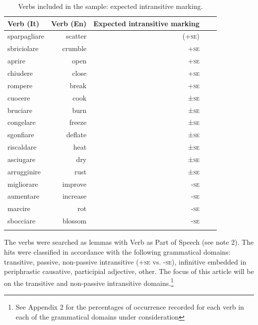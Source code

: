 \documentclass[output=paper,colorlinks,citecolor=brown
]{langscibook}
\begin{document}
\begin{table}[hbt!]
\caption{Verbs included in the sample: expected intransitive marking. }
\label{tab:bentley_table_1}
 \begin{tabularx}{.8\textwidth}{X rrrr}
  \lsptoprule
  Verb (It)  & Verb (En) & Expected intransitive marking \\
  \midrule
sparpagliare & 	scatter	& (+\textsc{se}) \\
sbriciolare &	crumble	& +\textsc{se} \\
aprire 	& open	& +\textsc{se} \\
chiudere &	close	& +\textsc{se} \\
rompere &	break	& +\textsc{se} \\
cuocere &	cook	& ±\textsc{se} \\
bruciare &	burn	& ±\textsc{se} \\
congelare &	freeze	& ±\textsc{se} \\
sgonfiare &	deflate	& ±\textsc{se} \\
riscaldare &	heat	& ±\textsc{se} \\
asciugare &	dry	& ±\textsc{se} \\
arrugginire &	rust	& ±\textsc{se} \\
migliorare &	improve	& -\textsc{se} \\
aumentare &	increase	& -\textsc{se} \\
marcire	& rot	& -\textsc{se} \\
sbocciare &	blossom	& -\textsc{se} \\
  \lspbottomrule
 \end{tabularx}
\end{table}

The verbs were searched as lemmas with Verb as Part of Speech (see note 2). The hits were classified in accordance with the following grammatical domains: transitive, passive, non-passive intransitive (+\textsc{se} vs. -\textsc{se}), infinitive embedded in periphrastic causative, participial adjective, other. The focus of this article will be on the transitive and non-passive intransitive domains.\footnote{See Appendix 2 for the percentages of occurrence recorded for each verb in each of the grammatical domains under consideration}
\end{document}
